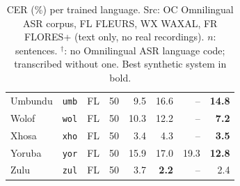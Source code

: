 \documentclass[10pt,twocolumn]{article}
\begin{document}
\begin{table}[h!]
\begin{tabular}{llcrrrrr}
Umbundu & \texttt{umb} & FL & 50 & 9.5 & 16.6 & -- & \textbf{14.8} \\
Wolof & \texttt{wol} & FL & 50 & 10.3 & 12.2 & -- & \textbf{7.2} \\
Xhosa & \texttt{xho} & FL & 50 & 3.4 & 4.3 & -- & \textbf{3.5} \\
Yoruba & \texttt{yor} & FL & 50 & 15.9 & 17.0 & 19.3 & \textbf{12.8} \\
Zulu & \texttt{zul} & FL & 50 & 3.7 & \textbf{2.2} & -- & 2.4 \\
\bottomrule
\end{tabular}
\caption{CER (\%) per trained language. Src: OC Omnilingual ASR corpus, FL FLEURS, WX WAXAL, FR FLORES+ (text only, no real recordings). $n$: sentences. $^\dagger$: no Omnilingual ASR language code; transcribed without one. Best synthetic system in bold.}
\label{tab:perlang}
\end{table}
\end{document}

